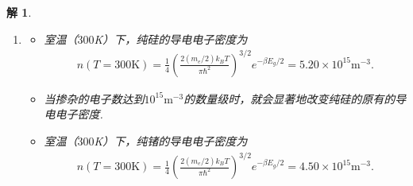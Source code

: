 \documentclass[UTF8,10pt,a4paper]{article}
\theoremstyle{Problem}
\theoremstyle{Solution}
\newtheorem*{sol}{解}
\begin{document}
\begin{sol}
\begin{enumerate}
\begin{itemize}
\begin{align}
                =&\frac{(2m_p^*)^{3/2}}{2\pi^2\hbar^3}e^{\beta(\varepsilon_v-\mu)}\int_{-\infty}^{\varepsilon_v}d\varepsilon\,(\varepsilon_v-\varepsilon)^{1/2}e^{\beta(\varepsilon-\varepsilon_v)}.
            \end{align}
            设$x=\beta(\varepsilon_v-\varepsilon)$，则
            \begin{align}
                \nonumber p(T)=&\frac{(2m_p^*)^{3/2}}{2\pi^2\hbar^3}e^{\beta(\varepsilon_v-\mu)}\frac{1}{\beta^{3/2}}\int_0^{\infty}dx\,x^{1/2}e^{-x}\\
                =&\frac{(2m_p^*)^{3/2}}{2\pi^2\hbar^3}e^{\beta(\varepsilon_v-\mu)}\frac{1}{\beta^{3/2}}\frac{\sqrt{\pi}}{2}=\frac{1}{4}\left(\frac{2m_h^*k_BT}{\pi\hbar^2}\right)^{3/2}e^{-\beta(\mu-\varepsilon_v)}.
            \end{align}
            电子数和空穴数之积为
            \begin{align}
                \label{nTpT}
                \nonumber n(T)p(T)=&\frac{1}{16}\left(\frac{2k_BT}{\pi\hbar^2}\right)^3(m_e^*m_h^*)^{3/2}e^{-\beta(\varepsilon_c-\varepsilon_v)}\\
                =&\frac{1}{2}\left(\frac{k_BT}{\pi\hbar^2}\right)^3(m_e^*m_h^*)^{3/2}e^{-\beta E_g}.
            \end{align}
            这一乘积仅依赖于导带上电子的态密度和价带上空穴的密度（是关于电子/空穴的有效质量的函数）以及带隙.
        \end{itemize}
        \item[(b)]
        \begin{itemize}
            \item[$\triangleright$] 室温（$300$K）下，纯硅的导电电子密度为
            \begin{align}
                n(T=300\text{K})=\frac{1}{4}\left(\frac{2(m_e/2)k_BT}{\pi\hbar^2}\right)^{3/2}e^{-\beta E_g/2}=5.20\times 10^{15}\text{m}^{-3}.
            \end{align}
            \item[$\triangleright$] 当掺杂的电子数达到$10^{15}\text{m}^{-3}$的数量级时，就会显著地改变纯硅的原有的导电电子密度.
            \item[$\triangleright$] 室温（$300$K）下，纯锗的导电电子密度为
            \begin{align}
                n(T=300\text{K})=\frac{1}{4}\left(\frac{2(m_e/2)k_BT}{\pi\hbar^2}\right)^{3/2}e^{-\beta E_g/2}=4.50\times 10^{15}\text{m}^{-3}.
            \end{align}
        \end{itemize}

\end{enumerate}
\end{sol}
\end{document}
